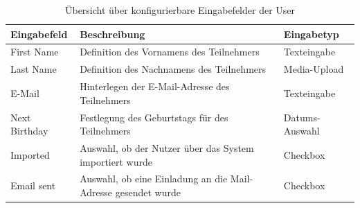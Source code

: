 \documentclass[
	ngerman,
	BCOR=8mm,
	headings=normal,
	parskip=half,
	headsepline,
	automark,
	listof=totoc,
	bibliography=totoc,
]{scrreprt}
\begin{document}
\begin{table}[h]
    \centering
    \renewcommand{\arraystretch}{1.3}
    \begin{tabular}{|p{3cm}|p{6cm}|p{5cm}|}
        \hline
        \textbf{Eingabefeld} & \textbf{Beschreibung} & \textbf{Eingabetyp} \\
        \hline
        First Name & Definition des Vornamens des Teilnehmers & Texteingabe \\
        \hline
        Last Name & Definition des Nachnamens des Teilnehmers & Media-Upload \\
        \hline
        E-Mail & Hinterlegen der E-Mail-Adresse des Teilnehmers & Texteingabe \\
        \hline
        Next Birthday & Festlegung des Geburtstags für des Teilnehmers  & Datums-Auswahl\\
        \hline
        Imported & Auswahl, ob der Nutzer über das System importiert wurde & Checkbox \\
        \hline
        Email sent & Auswahl, ob eine Einladung an die Mail-Adresse gesendet wurde  & Checkbox \\
        \hline
    \end{tabular}
    \caption{Übersicht über konfigurierbare Eingabefelder der User}
    \label{tab:eingabefelder_users}
\end{table}
\end{document}
